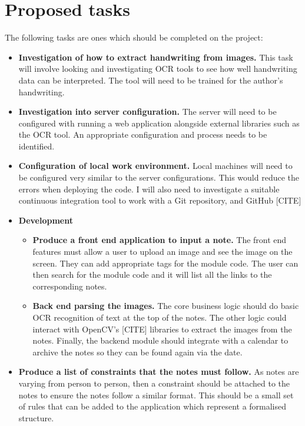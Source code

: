\documentclass[11pt,fleqn,twoside]{article}
\begin{document}
\section{Proposed tasks}
The following tasks are ones which should be completed on the project:
\begin{itemize}

\item \textbf{Investigation of how to extract handwriting from images.} This task will involve looking and investigating OCR tools to see how well handwriting data can be interpreted. The tool will need to be trained for the author's handwriting.

\item \textbf{Investigation into server configuration.} The server will need to be configured with running a web application alongside external libraries such as the OCR tool. An appropriate configuration and process needs to be identified.

\item \textbf{Configuration of local work environment.} Local machines will need to be configured very similar to the server configurations. This would reduce the errors when deploying the code. I will also need to investigate a suitable continuous integration tool to work with a Git repository, and GitHub [CITE]

\item \textbf{Development}
  \begin{itemize}

    \item \textbf{Produce a front end application to input a note.} The front end features must allow a user to upload an image and see the image on the screen. They can add appropriate tags for the module code. The user can then search for the module code and it will list all the links to the corresponding notes.

    \item \textbf{Back end parsing the images.} The core business logic should do basic OCR recognition of text at the top of the notes. The other logic could interact with OpenCV's [CITE] libraries to extract the images from the notes. Finally, the backend module should integrate with a calendar to archive the notes so they can be found again via the date.

  \end{itemize}

\item \textbf{Produce a list of constraints that the notes must follow.} As notes are varying from person to person, then a constraint should be attached to the notes to ensure the notes follow a similar format. This should be a small set of rules that can be added to the application which represent a formalised structure.


\end{itemize}
\end{document}
